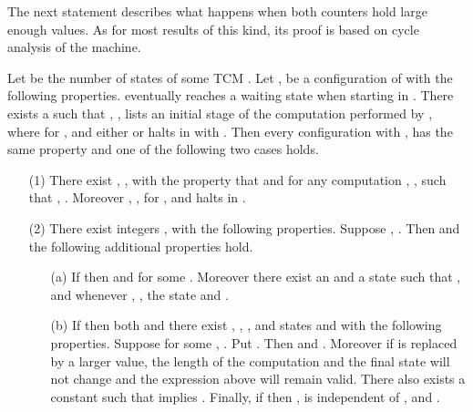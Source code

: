 \documentclass[12pt]{article}
\begin{document}
The next statement describes what happens when both counters hold
large enough values. As for most results of this kind, its proof is
based on cycle analysis of the machine. 
\begin{lemma}\label{fstg}
Let  be the number of states of some TCM . Let ,  be a configuration of  with the following
properties.  eventually reaches a waiting state when starting in . There exists a  such that
, ,  lists an initial stage of the computation
performed by , where  for , and
either  or  halts in  with . Then every configuration  with ,  has the same property and one of
the following two cases holds.
\begin{itemize}
\item[{\rm(1)}] There exist , , with the property that  and
   for any computation ,
  ,  such that ,
  . Moreover , ,  for ,
  and  halts in .

\item[{\rm(2)}] There exist integers , 
  with the following properties. Suppose , . Then 
   and 
  the following additional properties hold.
\begin{itemize}
\item[{\rm(a)}] If  then  and
   for some . Moreover there exist an  and a state  such that
  , and whenever , , the state
   and .

\item[{\rm(b)}] 
  If  then both  and
  there exist , , , and states  and  
  with the following properties. Suppose  for
  some , . Put . Then
   and .
  Moreover if  is replaced by a larger value, the length of the
  computation and the final state will not change and the expression above will remain
  valid. There also exists a constant  such that 
  implies . Finally, if  then ,  is
  independent of , and .

\end{itemize}
\end{itemize}
\end{lemma}
\end{document}
